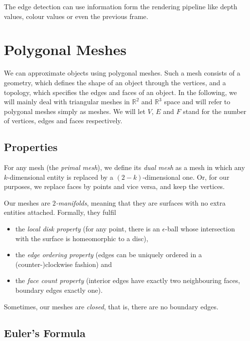 \documentclass[english]{panikzettel}
\begin{document}
The edge detection can use information form the rendering pipeline like depth values, colour values or even the previous frame.

\section{Polygonal Meshes}

We can approximate objects using polygonal meshes. Such a mesh consists of a geometry, which defines the shape of an object through the vertices, and a topology, which specifies the edges and faces of an object. In the following, we will mainly deal with triangular meshes in $\mathbb{R}^2$ and $\mathbb{R}^3$ space and will refer to polygonal meshes simply as meshes. We will let $V$, $E$ and $F$ stand for the number of vertices, edges and faces respectively.

\subsection{Properties}

For any mesh (the \emph{primal mesh}), we define its \emph{dual mesh} as a mesh in which any $k$-dimensional entity is replaced by a $(2-k)$-dimensional one. Or, for our purposes, we replace faces by points and vice versa, and keep the vertices.

Our meshes are $2$\emph{-manifolds}, meaning that they are surfaces with no extra entities attached. Formally, they fulfil

\begin{itemize}
    \item the \emph{local disk property} (for any point, there is an $\epsilon$-ball whose intersection with the surface is homeomorphic to a disc),
    \item the \emph{edge ordering property} (edges can be uniquely ordered in a (counter-)clockwise fashion) and
    \item the \emph{face count property} (interior edges have exactly two neighbouring faces, boundary edges exactly one).
\end{itemize}

Sometimes, our meshes are \emph{closed}, that is, there are no boundary edges.

\subsection{Euler's Formula}
\end{document}
